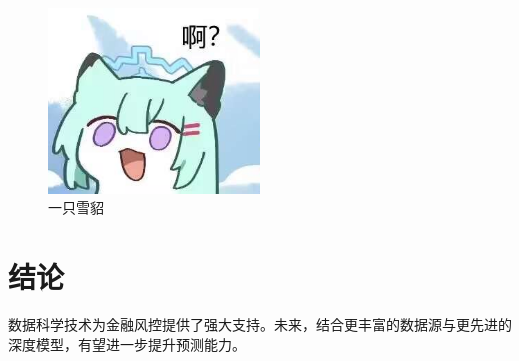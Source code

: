 \documentclass[12pt, a4paper]{ctexart}
\begin{document}
\begin{figure}[H]
    \centering
    \includegraphics[width=0.5\textwidth]{./images/test.jpg}
    \caption{一只雪貂}
    \label{fig:test}
\end{figure}


\section{结论}
数据科学技术为金融风控提供了强大支持。未来，结合更丰富的数据源与更先进的深度模型，有望进一步提升预测能力。

\newpage


\end{document}
